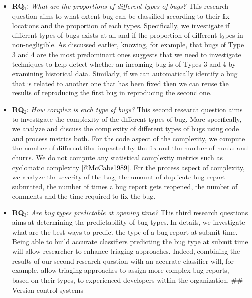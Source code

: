 \begin{itemize}
\item
  \textbf{RQ\(_1\):} \emph{What are the proportions of different types
  of bugs?} This research question aims to what extent bug can be
  classified according to their fix-locations and the proportion of each
  types. Specifically, we investigate if different types of bugs exists
  at all and if the proportion of different types in non-negligible. As
  discussed earlier, knowing, for example, that bugs of Type 3 and 4 are
  the most predominant ones suggests that we need to investigate
  techniques to help detect whether an incoming bug is of Types 3 and 4
  by examining historical data. Similarly, if we can automatically
  identify a bug that is related to another one that has been fixed then
  we can reuse the results of reproducing the first bug in reproducing
  the second one.
\item
  \textbf{RQ\(_2\):} \emph{How complex is each type of bugs?} This
  second research question aims to investigate the complexity of the
  different types of bug. More specifically, we analyze and discuss the
  complexity of different types of bugs using code and process metrics
  both. For the code aspect of the complexity, we compute the number of
  different files impacted by the fix and the number of hunks and
  churns. We do not compute any statistical complexity metrics such as
  cyclomatic complexity {[}@McCabe1989{]}. For the process aspect of
  complexity, we analyze the severity of the bug, the amount of
  duplicate bug report submitted, the number of times a bug report gets
  reopened, the number of comments and the time required to fix the bug.
\item
  \textbf{RQ\(_3\):} \emph{Are bug types predictable at opening time?}
  This third research questions aims at determining the predictability
  of bug types. In details, we investigate what are the best ways to
  predict the type of a bug report at submit time. Being able to build
  accurate classifiers predicting the bug type at submit time will allow
  researcher to enhance triaging approaches. Indeed, combining the
  results of our second research question with an accurate classifier
  will, for example, allow triaging approaches to assign more complex
  bug reports, based on their types, to experienced developers within
  the organization. \#\# Version control
  systems\label{sec:version-control}
\end{itemize}

